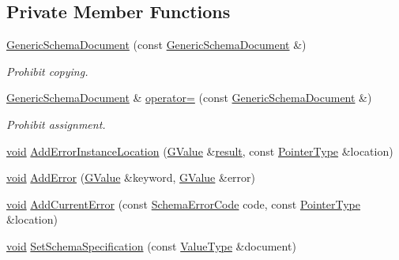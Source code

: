 \subsection*{Private Member Functions}
\begin{DoxyCompactItemize}
\item 
\hyperlink{classGenericSchemaDocument_ae5e4d5f87964ea7bfda2df824416d6da}{Generic\+Schema\+Document} (const \hyperlink{classGenericSchemaDocument}{Generic\+Schema\+Document} \&)
\begin{DoxyCompactList}\small\item\em Prohibit copying. \end{DoxyCompactList}\item 
\hyperlink{classGenericSchemaDocument}{Generic\+Schema\+Document} \& \hyperlink{classGenericSchemaDocument_a5f3a7cedd15e3568776af2f47df0fb66}{operator=} (const \hyperlink{classGenericSchemaDocument}{Generic\+Schema\+Document} \&)
\begin{DoxyCompactList}\small\item\em Prohibit assignment. \end{DoxyCompactList}\item 
\hyperlink{imgui__impl__opengl3__loader_8h_ac668e7cffd9e2e9cfee428b9b2f34fa7}{void} \hyperlink{classGenericSchemaDocument_accef2a20f4db6fc878ebdedbc0b39abb}{Add\+Error\+Instance\+Location} (\hyperlink{classGenericSchemaDocument_a777505b09fff6cf23b8cfed9e0350eec}{G\+Value} \&\hyperlink{imgui__impl__opengl3__loader_8h_aa7f56a70231ed8bc64f97aa7c37fcb19}{result}, const \hyperlink{classGenericSchemaDocument_aeb62f562d4dc024402b00f97cbcef747}{Pointer\+Type} \&location)
\item 
\hyperlink{imgui__impl__opengl3__loader_8h_ac668e7cffd9e2e9cfee428b9b2f34fa7}{void} \hyperlink{classGenericSchemaDocument_a28c66c5092582dd64225d1a534098266}{Add\+Error} (\hyperlink{classGenericSchemaDocument_a777505b09fff6cf23b8cfed9e0350eec}{G\+Value} \&keyword, \hyperlink{classGenericSchemaDocument_a777505b09fff6cf23b8cfed9e0350eec}{G\+Value} \&error)
\item 
\hyperlink{imgui__impl__opengl3__loader_8h_ac668e7cffd9e2e9cfee428b9b2f34fa7}{void} \hyperlink{classGenericSchemaDocument_ad2d783f0d0ec9944d06d01788c5bbee6}{Add\+Current\+Error} (const \hyperlink{group__RAPIDJSON__ERRORS_ga64f496d2cee8c9673f3105ec6008f290}{Schema\+Error\+Code} code, const \hyperlink{classGenericSchemaDocument_aeb62f562d4dc024402b00f97cbcef747}{Pointer\+Type} \&location)
\item 
\hyperlink{imgui__impl__opengl3__loader_8h_ac668e7cffd9e2e9cfee428b9b2f34fa7}{void} \hyperlink{classGenericSchemaDocument_a4af54b9334ca195cb5f8de1d8aae9ade}{Set\+Schema\+Specification} (const \hyperlink{classGenericSchemaDocument_ae246f1b6573a5a8a2c0d73d4eb64d53a}{Value\+Type} \&document)

\end{DoxyCompactItemize}
